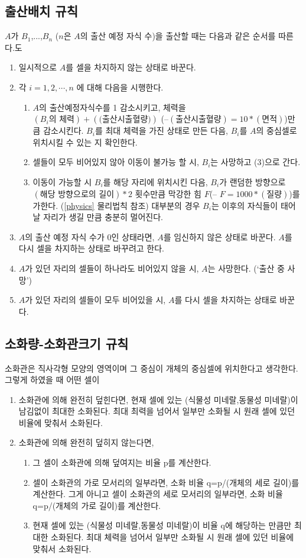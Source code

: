 \documentclass[a4paper,12pt]{article}
\begin{document}
\subsection{출산배치 규칙}\label{childbirth arrangement}
$A$가 $B_1$,...,$B_n$ ($n$은 $A$의 출산 예정 자식 수)을 출산할 때는 다음과 같은 순서를 따른다.도
\begin{enumerate}
\item 일시적으로 $A$를 셀을 차지하지 않는 상태로 바꾼다. 
\item 각 $i=1,2,\cdots,n$ 에 대해 다음을 시행한다. 
\begin{enumerate}
 \item 
 $A$의 출산예정자식수를 1 감소시키고, 체력을 $(B_i\text{의 체력})+(\text{(출산시출혈량)})$ (--$(\text{출산시출혈량})=10*(\text{면적})$)만큼 감소시킨다.  
 $B_i$를 최대 체력을 가진 상태로 만든 다음, $B_i$를 $A$의 중심셀로 위치시킬 수 있는 지 확인한다.
\item 셀들이 모두 비어있지 않아 이동이 불가능 할 시, $B_i$는 사망하고 (3)으로 간다.
\item 이동이 가능할 시 $B_i$를 해당 자리에 위치시킨 다음, $B_i$가 랜덤한 방향으로 $(\text{해당 방향으로의 길이})*2$ 횟수만큼 막강한 힘 $F$(-- $F=1000*(\text{질량})$)를 가한다. (\ref{physics} 물리법칙 참조) 대부분의 경우 $B_i$는 이후의 자식들이 태어날 자리가 생길 만큼 충분히 멀어진다. 

\end{enumerate}
\item $A$의 출산 예정 자식 수가 0인 상태라면, $A$를 임신하지 않은 상태로 바꾼다. $A$를 다시 셀을 차지하는 상태로 바꾸려고 한다. 
\item $A$가 있던 자리의 셀들이 하나라도 비어있지 않을 시, $A$는 사망한다. (‘출산 중 사망’)
\item $A$가 있던 자리의 셀들이 모두 비어있을 시, $A$를 다시 셀을 차지하는 상태로 바꾼다. 
\end{enumerate}

\subsection{소화량-소화관크기 규칙}\label{digestion amount}
소화관은 직사각형 모양의 영역이며 그 중심이 개체의 중심셀에 위치한다고 생각한다. 그렇게 하였을 때 어떤 셀이 
\begin{enumerate}
\item 소화관에 의해 완전히 덮힌다면, 
현재 셀에 있는 (식물성 미네랄,동물성 미네랄)이 남김없이 최대한 소화된다. 최대 최력을 넘어서 일부만 소화될 시 원래 셀에 있던 비율에 맞춰서 소화된다. 
\item 소화관에 의해 완전히 덮히지 않는다면, 
\begin{enumerate} 
\item 그 셀이 소화관에 의해 덮여지는 비율 p를 계산한다. 
\item 셀이 소화관의 가로 모서리의 일부라면, 소화 비율 q=p/(개체의 세로 길이)를 계산한다. 그게 아니고 셀이 소화관의 세로 모서리의 일부라면, 소화 비율 q=p/(개체의 가로 길이)를 계산한다. 
\item 현재 셀에 있는 (식물성 미네랄,동물성 미네랄)이 비율 q에 해당하는 만큼만 최대한 소화된다. 최대 체력을 넘어서 일부만 소화될 시 원래 셀에 있던 비율에 맞춰서 소화된다. 
\end{enumerate}
\end{enumerate}
\end{document}
